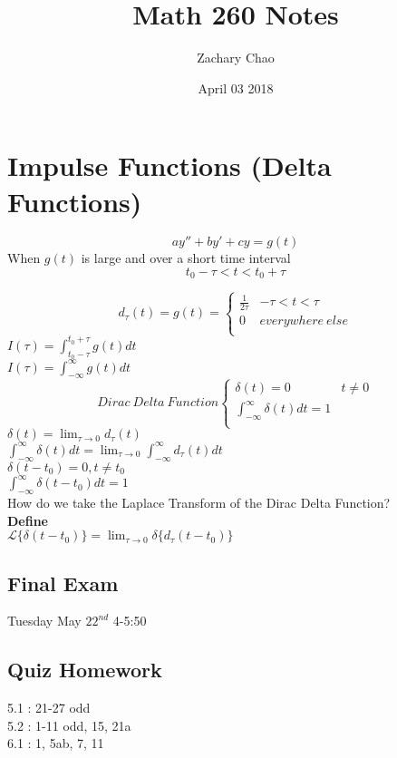 \documentclass[12pt, letterpaper, twoside]{article}
\title{Math 260 Notes}
\author{Zachary Chao}
\date{April 03 2018}
\newcommand{\laplace}{\mathcal{L}}
\begin{document}
\section{Impulse Functions (Delta Functions)}
$$ay'' + by' + cy = g(t)$$
When $g(t)$ is large and over a short time interval
$$t_0 - \tau < t < t_0 + \tau$$


\[
  d_\tau(t) = g(t) = 
  \begin{cases}
  	\frac{1}{2\tau} & -\tau < t < \tau \\
  	0 & everywhere \ else \\
  \end{cases}
\]
$I(\tau) = \int_{t_0 - \tau}^{t_0 + \tau} g(t) dt$\\
$I(\tau) = \int_{-\infty}^{\infty} g(t) dt$\\
\[
  Dirac \ Delta \ Function
  \begin{cases}
  	\delta(t) = 0 & t \neq 0 \\
  	\int_{-\infty}^{\infty} \delta(t) dt = 1\\
  \end{cases}
\]
$\delta(t) = \lim_{\tau \to 0} d_\tau(t)$\\
$\int_{-\infty}^\infty \delta(t) dt = \lim_{\tau \to 0} \int_{-\infty}^\infty d_\tau(t) dt$\\
$\delta (t-t_0) = 0, t \neq t_0$\\
$\int_{-\infty}^\infty \delta (t-t_0) dt = 1$\\
How do we take the Laplace Transform of the Dirac Delta Function?\\
\textbf{Define}\\
$\laplace\{\delta (t-t_0)\} = \lim_{\tau \to 0} \delta\{d_\tau(t-t_0)\}$\\



\subsection*{Final Exam}
Tuesday May $22^{nd}$ 4-5:50


\subsection*{Quiz Homework}
5.1 : 21-27 odd\\
5.2 : 1-11 odd, 15, 21a\\
6.1 : 1, 5ab, 7, 11\\
\end{document}
